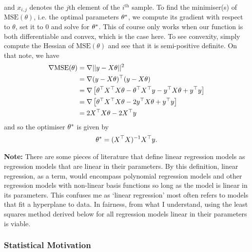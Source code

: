 \documentclass[11pt]{article}
\begin{document}
and $x_{i,j}$ denotes the $j$th element of the $i^{\text{th}}$ sample. To find the minimiser(s) of $\text{MSE}(\theta)$, i.e. the optimal parameters $\theta^{*}$, we compute its gradient with respect to $\theta$, set it to $0$ and solve for $\theta^{*}$. This of course only works when our function is both differentiable and convex, which is the case here. To see convexity, simply compute the Hessian of $\text{MSE}(\theta)$ and see that it is semi-positive definite. On that note, we have
\begin{align*}
    \nabla\text{MSE}(\theta)
    &=
    \nabla||y-X\theta||^2\\
    &=
    \nabla(y-X\theta)^{\top}(y-X\theta)\\
    &=
    \nabla\left[\theta^{\top}X^{\top}X\theta-\theta^{\top}X^{\top}y-y^{\top}X\theta+y^{\top}y\right]\\
    &=
    \nabla\left[\theta^{\top}X^{\top}X\theta-2y^{\top}X\theta+y^{\top}y\right]\\
    &=
    2X^{\top}X\theta-2X^{\top}y
\end{align*}
and so the optimiser $\theta^{*}$ is given by
$$
\theta^{*}=(X^{\top}X)^{-1}X^{\top}y.
$$

\begin{tcolorbox}[colback=c1]
    \textbf{Note:} There are some pieces of literature that define linear regression models as regression models that are linear in their parameters. By this definition, linear regression, as a term, would encompass polynomial regression models and other regression models with non-linear basis functions so long as the model is linear in its parameters. This confuses me as `linear regression' most often refers to models that fit a hyperplane to data. In fairness, from what I understand, using the least squares method derived below for all regression models linear in their parameters is viable.
\end{tcolorbox}

\subsubsection{Statistical Motivation}
\end{document}
